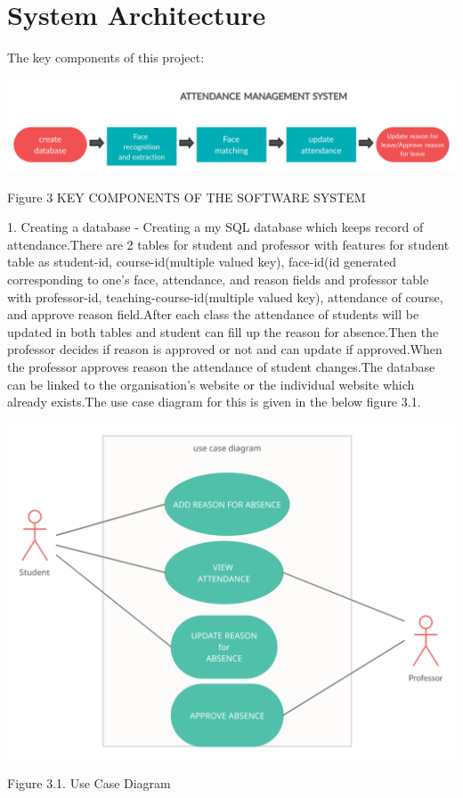 \documentclass[10pt,twocolumn,letterpaper]{article}
\begin{document}
\section{System Architecture}


The key components of this project:
\begin{center}
\includegraphics[width=1\linewidth]{images/1.png}
\caption{Figure 3 KEY COMPONENTS OF THE SOFTWARE SYSTEM}
\end{center}

1. Creating a database - Creating a my SQL database which keeps record of attendance.There are 2 tables for student and professor with features for student table as student-id, course-id(multiple valued key), face-id(id generated corresponding to one's face, attendance, and reason fields and professor table with professor-id, teaching-course-id(multiple valued key), attendance of course, and approve reason field.After each class the attendance of students will be updated in both tables and student can fill up the reason for absence.Then the professor decides if reason is approved or not and can update if approved.When the professor approves reason the attendance of student changes.The database can be linked to the organisation's website or the individual website which already exists.The use case diagram for this is given in the below figure 3.1.
\begin{center}
\includegraphics[width=1\linewidth]{images/use_case_diagram.png}
\caption{Figure 3.1. Use Case Diagram}
\end{center}
\end{document}

